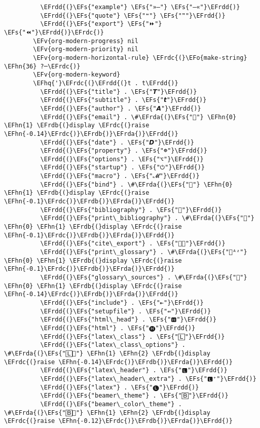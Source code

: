 \documentclass[12pt]{article}
\theoremstyle{plain}%
\theoremstyle{definition}
\theoremstyle{remark}
\newcommand{\EFs}[1]{\textcolor{EFs}{#1}} %
\newcommand{\EFv}[1]{\textcolor{EFv}{#1}} %
\newcommand{\EFo}[1]{\textcolor{EFo}{#1}} %
\newcommand{\EFhn}[1]{\textcolor{EFhn}{\textbf{#1}}} %
\newcommand{\EFhq}[1]{\textcolor{EFhq}{#1}} %
\newcommand{\EFrda}[1]{\textcolor{EFrda}{#1}} %
\newcommand{\EFrdb}[1]{\textcolor{EFrdb}{#1}} %
\newcommand{\EFrdc}[1]{\textcolor{EFrdc}{#1}} %
\newcommand{\EFrdd}[1]{\textcolor{EFrdd}{#1}} %
\begin{document}
\begin{Code}
\begin{Verbatim}
          \EFrdd{(}\EFs{"example"} \EFs{"»–"} \EFs{"–«"}\EFrdd{)}
          \EFrdd{(}\EFs{"quote"} \EFs{"❝"} \EFs{"❞"}\EFrdd{)}
          \EFrdd{(}\EFs{"export"} \EFs{"⏩"} \EFs{"⏪"}\EFrdd{)}\EFrdc{)}
        \EFv{org-modern-progress} nil
        \EFv{org-modern-priority} nil
        \EFv{org-modern-horizontal-rule} \EFrdc{(}\EFo{make-string} \EFhn{36} ?─\EFrdc{)}
        \EFv{org-modern-keyword}
        \EFhq{'}\EFrdc{(}\EFrdd{(}t . t\EFrdd{)}
          \EFrdd{(}\EFs{"title"} . \EFs{"𝙏"}\EFrdd{)}
          \EFrdd{(}\EFs{"subtitle"} . \EFs{"𝙩"}\EFrdd{)}
          \EFrdd{(}\EFs{"author"} . \EFs{"𝘼"}\EFrdd{)}
          \EFrdd{(}\EFs{"email"} . \#\EFrda{(}\EFs{""} \EFhn{0} \EFhn{1} \EFrdb{(}display \EFrdc{(}raise \EFhn{-0.14}\EFrdc{)}\EFrdb{)}\EFrda{)}\EFrdd{)}
          \EFrdd{(}\EFs{"date"} . \EFs{"𝘿"}\EFrdd{)}
          \EFrdd{(}\EFs{"property"} . \EFs{"☸"}\EFrdd{)}
          \EFrdd{(}\EFs{"options"} . \EFs{"⌥"}\EFrdd{)}
          \EFrdd{(}\EFs{"startup"} . \EFs{"⏻"}\EFrdd{)}
          \EFrdd{(}\EFs{"macro"} . \EFs{"𝓜"}\EFrdd{)}
          \EFrdd{(}\EFs{"bind"} . \#\EFrda{(}\EFs{""} \EFhn{0} \EFhn{1} \EFrdb{(}display \EFrdc{(}raise \EFhn{-0.1}\EFrdc{)}\EFrdb{)}\EFrda{)}\EFrdd{)}
          \EFrdd{(}\EFs{"bibliography"} . \EFs{""}\EFrdd{)}
          \EFrdd{(}\EFs{"print\_bibliography"} . \#\EFrda{(}\EFs{""} \EFhn{0} \EFhn{1} \EFrdb{(}display \EFrdc{(}raise \EFhn{-0.1}\EFrdc{)}\EFrdb{)}\EFrda{)}\EFrdd{)}
          \EFrdd{(}\EFs{"cite\_export"} . \EFs{"⮭"}\EFrdd{)}
          \EFrdd{(}\EFs{"print\_glossary"} . \#\EFrda{(}\EFs{"ᴬᶻ"} \EFhn{0} \EFhn{1} \EFrdb{(}display \EFrdc{(}raise \EFhn{-0.1}\EFrdc{)}\EFrdb{)}\EFrda{)}\EFrdd{)}
          \EFrdd{(}\EFs{"glossary\_sources"} . \#\EFrda{(}\EFs{""} \EFhn{0} \EFhn{1} \EFrdb{(}display \EFrdc{(}raise \EFhn{-0.14}\EFrdc{)}\EFrdb{)}\EFrda{)}\EFrdd{)}
          \EFrdd{(}\EFs{"include"} . \EFs{"⇤"}\EFrdd{)}
          \EFrdd{(}\EFs{"setupfile"} . \EFs{"⇚"}\EFrdd{)}
          \EFrdd{(}\EFs{"html\_head"} . \EFs{"🅷"}\EFrdd{)}
          \EFrdd{(}\EFs{"html"} . \EFs{"🅗"}\EFrdd{)}
          \EFrdd{(}\EFs{"latex\_class"} . \EFs{"🄻"}\EFrdd{)}
          \EFrdd{(}\EFs{"latex\_class\_options"} . \#\EFrda{(}\EFs{"🄻"} \EFhn{1} \EFhn{2} \EFrdb{(}display \EFrdc{(}raise \EFhn{-0.14}\EFrdc{)}\EFrdb{)}\EFrda{)}\EFrdd{)}
          \EFrdd{(}\EFs{"latex\_header"} . \EFs{"🅻"}\EFrdd{)}
          \EFrdd{(}\EFs{"latex\_header\_extra"} . \EFs{"🅻⁺"}\EFrdd{)}
          \EFrdd{(}\EFs{"latex"} . \EFs{"🅛"}\EFrdd{)}
          \EFrdd{(}\EFs{"beamer\_theme"} . \EFs{"🄱"}\EFrdd{)}
          \EFrdd{(}\EFs{"beamer\_color\_theme"} . \#\EFrda{(}\EFs{"🄱"} \EFhn{1} \EFhn{2} \EFrdb{(}display \EFrdc{(}raise \EFhn{-0.12}\EFrdc{)}\EFrdb{)}\EFrda{)}\EFrdd{)}

\end{Verbatim}
\end{Code}
\end{document}
